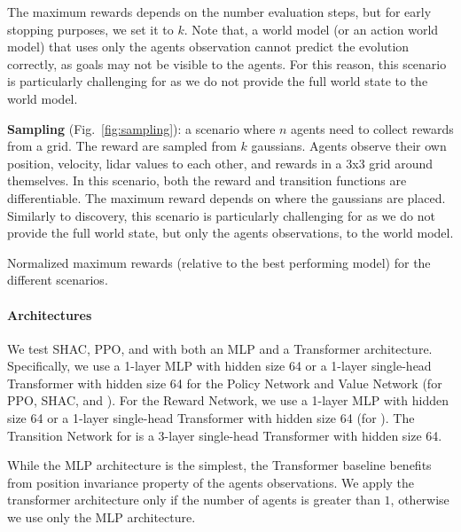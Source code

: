 \begin{compactitem}
         The maximum rewards depends on the number evaluation steps, but for early stopping purposes, we set it to $k$. 
         Note that, a world model (or an action world model) that uses only the agents observation cannot predict the evolution correctly, as goals may not be visible to the agents. For this reason, this scenario is particularly challenging for \fname{} as we do not provide the full world state to the world model.
     \item \textbf{Sampling} (Fig.~\ref{fig:sampling}): 
         a scenario where $n$ agents need to collect rewards from a grid. The reward are sampled from $k$ gaussians. Agents observe their own position, velocity, lidar values to each other, and rewards in a 3x3 grid around themselves.  
         In this scenario, both the reward and transition functions are differentiable. 
         The maximum reward depends on where the gaussians are placed.
         Similarly to discovery, this scenario is particularly challenging for \fname{} as we do not provide the full world state, but only the agents observations, to the world model.
\end{compactitem}

\begin{table}[!t]
    \centering
    
    \caption{Normalized maximum rewards (relative to the best performing model) for the different scenarios.}
\end{table}

\paragraph{Architectures}
We test SHAC, PPO, and \fname{} with both an MLP and a Transformer architecture. Specifically, we use a 1-layer MLP with hidden size 64 or a 1-layer single-head Transformer with hidden size 64 for the Policy Network and Value Network (for PPO, SHAC, and \fname{}). For the Reward Network, we use a 1-layer MLP with hidden size 64 or a 1-layer single-head Transformer with hidden size 64 (for \fname{}). The Transition Network for \fname{} is a 3-layer single-head Transformer with hidden size 64.

While the MLP architecture is the simplest, the Transformer baseline benefits from position invariance property of the agents observations. We apply the transformer architecture only if the number of agents is greater than $1$, otherwise we use only the MLP architecture. 

